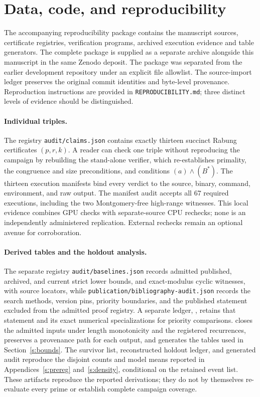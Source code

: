 \section{Data, code, and reproducibility}\label{s:data}

The accompanying reproducibility package contains the manuscript sources,
certificate registries, verification programs, archived execution evidence and
table generators. The complete package is supplied as a separate archive
alongside this manuscript in the same Zenodo deposit.
The package was separated from the earlier development repository under an
explicit file allowlist. The source-import ledger preserves the original
commit identities and byte-level provenance. Reproduction instructions are
provided in \texttt{REPRODUCIBILITY.md}; three distinct levels of evidence
should be distinguished.

\paragraph{Individual triples.}
The registry \texttt{audit/claims.json} contains exactly thirteen succinct
Rabung certificates $(p,r,k)$.  A reader can check one triple without
reproducing the campaign by rebuilding the stand-alone verifier, which re-establishes
primality, the congruence and size preconditions, and conditions
$(a)\wedge(B^*)$. The thirteen execution manifests
bind every verdict to the source, binary, command, environment, and raw
output. The manifest audit accepts all $67$ required executions, including the two
Montgomery-free high-range witnesses.  This local evidence combines GPU checks
with separate-source CPU rechecks; none is an independently administered
replication.  External rechecks remain an optional avenue for corroboration.

\paragraph{Derived tables and the holdout analysis.}
The separate registry \texttt{audit/baselines.json} records admitted published,
archived, and current strict lower bounds, and exact-modulus cyclic witnesses,
with source locators, while
\texttt{publication/bibliography-audit.json} records the search methods,
version pins, priority boundaries, and the published statement excluded from the admitted proof registry.
A separate ledger, , retains that statement
and its exact numerical specializations for priority comparisons.  closes the admitted
inputs under length monotonicity and the registered recurrences, preserves a
provenance path for each output, and generates the tables used in
Section~\ref{s:bounds}. The survivor list, reconstructed
holdout ledger, and generated audit reproduce the disjoint counts and model
means reported in Appendices~\ref{s:prereg} and~\ref{s:density}, conditional on
the retained event list.  These artifacts reproduce the reported derivations;
they do not by themselves re-evaluate every prime or establish complete
campaign coverage.

